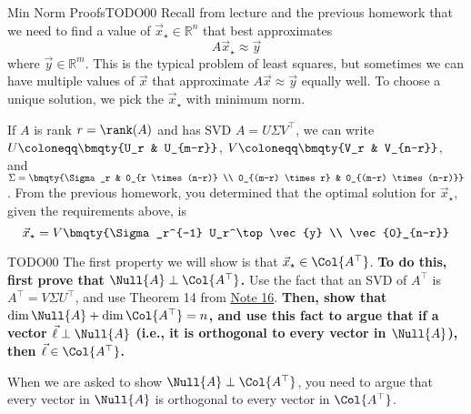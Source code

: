 \begin{problem}{Min Norm Proofs}{TODO}{0}{0}
    Recall from lecture and the previous homework that we need to find a value of $\vec{x}_{\star} \in \mathbb{R}^n$ that best approximates
    \begin{equation}
        A \vec{x}_{\star} \approx \vec{y}
    \end{equation}
    where $\vec{y} \in \mathbb{R}^m$. This is the typical problem of least squares, but sometimes we can have multiple values of $\vec{x}$ that approximate $A \vec{x} \approx \vec{y}$ equally well. To choose a unique solution, we pick the $\vec{x}_{\star}$ with minimum norm.

    If $A$ is rank $r = \rank(A)$ and has SVD $A = U \Sigma V^\top$, we can write $U \coloneqq \bmqty{U_r & U_{m-r}}$, $V \coloneqq \bmqty{V_r & V_{n-r}}$, and $\Sigma = \bmqty{\Sigma_r & 0_{r \times (n-r)} \\ 0_{(m-r) \times r} & 0_{(m-r) \times (n-r)}}$. From the previous homework, you determined that the optimal solution for $\vec{x}_{\star}$, given the requirements above, is
    \begin{equation}
        \label{eq:prev_hw_sol}
        \vec{x}_{\star} = V \bmqty{\Sigma_r^{-1} U_r^\top \vec{y} \\ \vec{0}_{n-r}}
    \end{equation}

    \begin{problempartlist}
        \begin{problempart}{TODO}{0}{0}
            The first property we will show is that $\vec{x}_{\star} \in \Col{A^\top}$. \textbf{To do this, first prove that $\Null{A} \perp \Col{A^\top}$.} Use the fact that an SVD of $A^\top$ is $A^\top = V \Sigma U^\top$, and use Theorem 14 from \href{https://eecs16b.org/notes/fa22/note16.pdf}{Note 16}. \textbf{Then, show that $\dim{\Null{A}} + \dim{\Col{A^\top}} = n$, and use this fact to argue that if a vector $\vec{\ell} \perp \Null{A}$ (i.e., it is orthogonal to every vector in $\Null{A}$), then $\vec{\ell} \in \Col{A^\top}$.}

            \begin{hint}
                When we are asked to show $\Null{A} \perp \Col{A^\top}$, you need to argue that every vector in $\Null{A}$ is orthogonal to every vector in $\Col{A^\top}$.
            \end{hint}
        \end{problempart}


\end{problempartlist}
\end{problem}
